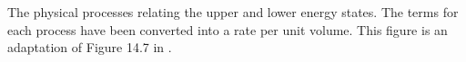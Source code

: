 \label{fig:energy_diagram} The physical processes relating the upper and lower energy states. The terms for each process have been converted into a rate per unit volume. This figure is an adaptation of Figure 14.7 in \citet{Stahler_1992}.